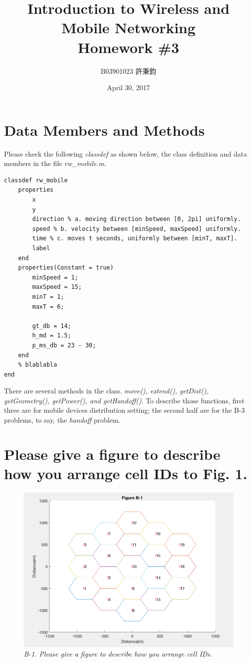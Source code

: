 \documentclass{article}
\title{Introduction to Wireless and Mobile Networking\\ Homework \#3}
\author{B03901023 許秉鈞}
\date{April 30, 2017} %
\begin{document}
\maketitle
\section{Data Members and Methods}
Please check the following \emph{classdef} as shown below, the class definition and data members in the file \emph{rw\_mobile.m}.
\begin{lstlisting}[caption = {rw\_mobile.m}]
classdef rw_mobile
    properties
        x
        y
        direction % a. moving direction between [0, 2pi] uniformly.
        speed % b. velocity between [minSpeed, maxSpeed] uniformly.
        time % c. moves t seconds, uniformly between [minT, maxT].
        label
    end
    properties(Constant = true)
        minSpeed = 1;
        maxSpeed = 15;
        minT = 1;
        maxT = 6;

        gt_db = 14;
        h_md = 1.5;
        p_ms_db = 23 - 30;
    end
    % blablabla
end
\end{lstlisting}
There are several methods in the class. \emph{move(), extend(), getDist(), getGeometry(), getPower(), and getHandoff()}. To describe those functions, first three are for mobile devices distribution setting; the second half are for the B-3 problems, to say, the \emph{handoff} problem.

\section{Please give a figure to describe how you arrange cell IDs to Fig. 1.}
\begin{figure}[h]
    \centering
    \includegraphics[width=1\textwidth]{fig1}
    \caption{\emph{B-1. Please give a figure to describe how you arrange cell IDs.}}
    \label{fig:mesh1}
\end{figure}
\end{document}
